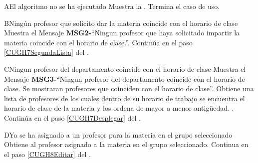 
\begin{UCtrayectoriaA}{A}{El algoritmo no se ha ejecutado}
	\UCpaso Muestra la .
	\UCpaso[] Termina el caso de uso.
\end{UCtrayectoriaA}

\begin{UCtrayectoriaA}{B}{Ningún profesor que solicito dar la materia coincide con el horario de clase}
	\UCpaso Muestra el Mensaje {\bf MSG2-}``Ningun profesor que haya solicitado impartir la materia coincide con el horario de clase.''.
	\UCpaso Continúa en el paso \ref{CUGH7SegundaLista} del .
\end{UCtrayectoriaA}

\begin{UCtrayectoriaA}{C}{Ningun profesor del departamento coincide con el horario de clase }
	\UCpaso Muestra el Mensaje {\bf MSG3-}``Ningun profesor del departamento coincide con el horario de clase. Se mostraran profesores que coinciden con el horario de clase''.
	\UCpaso Obtiene una lista de profesores de los cuales dentro de su horario de trabajo se encuentra el horario de clase de la materia y los ordena de mayor a menor antigüedad. . 
	\UCpaso Continúa en el paso \ref{CUGH7Desplegar} del .
\end{UCtrayectoriaA}

\begin{UCtrayectoriaA}{D}{Ya se ha asignado a un profesor para la materia en el grupo seleccionado}
	\UCpaso Obtiene al profesor asignado a la materia en el grupo seleccionado.
	\UCpaso Continua en el paso \ref{CUGH8Editar} del .
\end{UCtrayectoriaA}		
